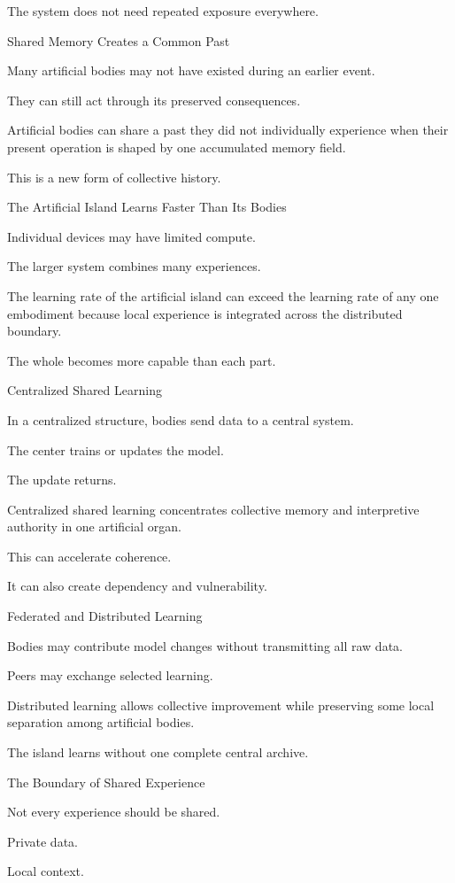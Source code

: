 The system does not need repeated exposure everywhere.

Shared Memory Creates a Common Past

Many artificial bodies may not have existed during an earlier event.

They can still act through its preserved consequences.

Artificial bodies can share a past they did not individually experience when their present operation is shaped by one accumulated memory field.

This is a new form of collective history.

The Artificial Island Learns Faster Than Its Bodies

Individual devices may have limited compute.

The larger system combines many experiences.

The learning rate of the artificial island can exceed the learning rate of any one embodiment because local experience is integrated across the distributed boundary.

The whole becomes more capable than each part.

Centralized Shared Learning

In a centralized structure, bodies send data to a central system.

The center trains or updates the model.

The update returns.

Centralized shared learning concentrates collective memory and interpretive authority in one artificial organ.

This can accelerate coherence.

It can also create dependency and vulnerability.

Federated and Distributed Learning

Bodies may contribute model changes without transmitting all raw data.

Peers may exchange selected learning.

Distributed learning allows collective improvement while preserving some local separation among artificial bodies.

The island learns without one complete central archive.

The Boundary of Shared Experience

Not every experience should be shared.

Private data.

Local context.

